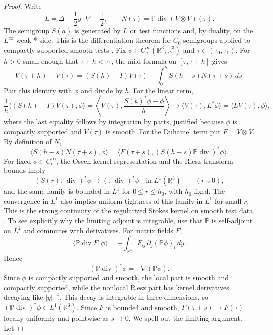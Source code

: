 \documentclass[11pt]{amsart}
\theoremstyle{plain}
\theoremstyle{definition}
\theoremstyle{remark}
\numberwithin{equation}{section}
\begin{document}
\begin{proof}
Write
\[
   L=\Delta-\frac12y\cdot\nabla-\frac12,
   \qquad
   N(\tau)=\mathbb P\operatorname{div}(V\otimes V)(\tau).
\]
The semigroup \(S(a)\) is generated by \(L\) on test functions and, by
duality, on the \(L^\infty\)-weak-* side.  This is the differentiation
theorem for \(C_0\)-semigroups applied to compactly supported smooth tests
\cite{Pazy1983}.  Fix
\(\phi\in C_c^\infty(\mathbb R^3;\mathbb R^3)\) and
\(\tau\in(\tau_0,\tau_1)\).  For \(h>0\) small enough that
\(\tau+h<\tau_1\), the mild formula on \([\tau,\tau+h]\) gives
\[
   V(\tau+h)-V(\tau)
   =
   (S(h)-I)V(\tau)
   -
   \int_0^h S(h-s)N(\tau+s)\,ds .
\]
Pair this identity with \(\phi\) and divide by \(h\).  For the linear term,
\[
   \frac1h\langle (S(h)-I)V(\tau),\phi\rangle
   =
   \left\langle V(\tau),\frac{S(h)^*\phi-\phi}{h}\right\rangle
   \to
   \langle V(\tau),L^*\phi\rangle
   =
   \langle LV(\tau),\phi\rangle ,
\]
where the last equality follows by integration by parts, justified because
\(\phi\) is compactly supported and \(V(\tau)\) is smooth.  For the Duhamel
term put \(F=V\otimes V\).  By definition of \(N\),
\[
   \langle S(h-s)N(\tau+s),\phi\rangle
   =
   \langle F(\tau+s),
      (S(h-s)\mathbb P\operatorname{div})^*\phi\rangle .
\]
For fixed \(\phi\in C_c^\infty\), the Oseen-kernel representation and the
Riesz-transform bounds imply
\[
   (S(r)\mathbb P\operatorname{div})^*\phi
   \to
   (\mathbb P\operatorname{div})^*\phi
   \quad\text{in }L^1(\mathbb R^3)
   \qquad (r\downarrow0),
\]
and the same family is bounded in \(L^1\) for \(0\le r\le h_0\), with \(h_0\)
fixed.  The convergence in \(L^1\) also implies uniform tightness of this
family in \(L^1\) for small \(r\).  This is the strong continuity of the
regularized Stokes kernel on smooth test data \cite{Stein1970,Sohr2001}.
To see explicitly why the limiting adjoint is integrable, use that
\(\mathbb P\) is self-adjoint on \(L^2\) and commutes with derivatives.  For
matrix fields \(F\),
\[
   \langle \mathbb P\operatorname{div}F,\phi\rangle
   =
   -\int_{\mathbb R^3}F_{ij}\,
      \partial_j(\mathbb P\phi)_i\,dy .
\]
Hence
\[
   (\mathbb P\operatorname{div})^*\phi
   =
   -\nabla(\mathbb P\phi).
\]
Since \(\phi\) is compactly supported and smooth, the local part is smooth and
compactly supported, while the nonlocal Riesz part has kernel derivatives
decaying like \(|y|^{-4}\).  This decay is integrable in three dimensions,
so \((\mathbb P\operatorname{div})^*\phi\in L^1(\mathbb R^3)\).
Since \(F\) is bounded and smooth, \(F(\tau+s)\to F(\tau)\) locally uniformly
and pointwise as \(s\to0\).  We spell out the limiting argument.  Let

\end{proof}
\end{document}
